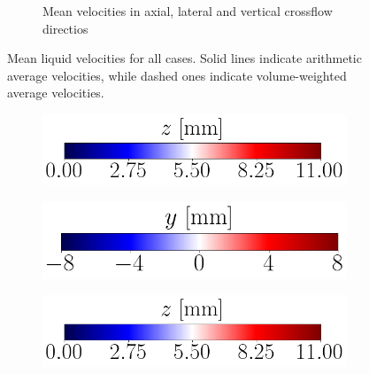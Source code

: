\begin{figure}[ht]
\begin{subfigure}[b]{1.1\textwidth}
	\caption{Mean velocities in axial, lateral and vertical crossflow directios}
\end{subfigure}

   \caption[Sampled mean liquid velocities for all cases]{Mean liquid velocities for all cases. Solid lines indicate arithmetic average velocities, while dashed ones indicate volume-weighted average velocities.}
\label{fig:ch8_jicf_liquid_mean_velocities_with_x}
\end{figure}



\begin{figure}[ht]
\centering
\begin{subfigure}[b]{0.3\textwidth}
	\centering
	\hspace*{-0.2in}
   \includegraphics[scale=0.2]{./part2_developments/figures_ch5_resolved_JICF/SPRAY_characterization/velocities/scatterplots_colorbar_z.png}
\end{subfigure}
\begin{subfigure}[b]{0.3\textwidth}
	\centering
	\hspace*{0.36in}
   \includegraphics[scale=0.2]{./part2_developments/figures_ch5_resolved_JICF/SPRAY_characterization/velocities/scatterplots_colorbar_y.png}
\end{subfigure}
\begin{subfigure}[b]{0.3\textwidth}
	\centering
	\hspace*{0.7in}
   \includegraphics[scale=0.2]{./part2_developments/figures_ch5_resolved_JICF/SPRAY_characterization/velocities/scatterplots_colorbar_z.png}
\end{subfigure}


\end{figure}
